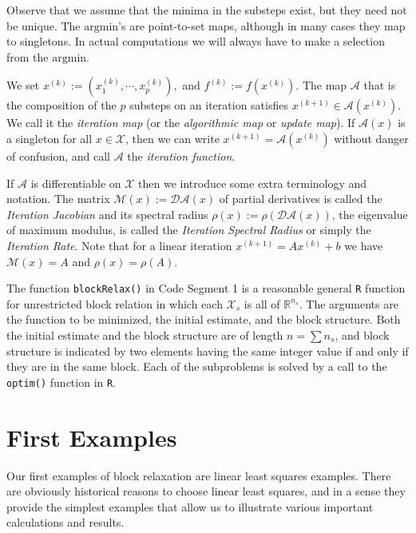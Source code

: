 \documentclass[
  12pt,
]{book}
\begin{document}
Observe that we assume that the minima in the substeps exist, but they need not be unique. The \(\mathrm{argmin}\)'s are
point-to-set maps, although in many cases they map to singletons. In actual computations we will always have to make a
selection from the \(\mathrm{argmin}\).

We set \(x^{(k)}:=(x^{(k)}_1,\cdots,x^{(k)}_p),\)
and \(f^{(k)}:=f(x^{(k)}).\)
The map \(\mathcal{A}\) that is the composition of the \(p\) substeps on an iteration satisfies \(x^{(k+1)}\in\mathcal{A}(x^{(k)})\). We call it the \emph{iteration map} (or the \emph{algorithmic map} or \emph{update map}).
If \(\mathcal{A}(x)\) is a singleton for all \(x\in\mathcal{X}\), then we can write \(x^{(k+1)}=\mathcal{A}(x^{(k)})\) without danger of confusion, and call \(\mathcal{A}\) the \emph{iteration function}.

If \(\mathcal{A}\) is differentiable on \(\mathcal{X}\) then we introduce some extra terminology and notation. The matrix \(\mathcal{M}(x):=\mathcal{DA}(x)\) of partial derivatives is called the \emph{Iteration Jacobian} and its spectral radius \(\rho(x):=\rho(\mathcal{DA}(x))\), the eigenvalue of maximum modulus, is called the \emph{Iteration Spectral Radius} or simply the \emph{Iteration Rate}. Note that for a linear iteration \(x^{(k+1)}=Ax^{(k)}+b\) we have \(\mathcal{M}(x)=A\) and \(\rho(x)=\rho(A)\).

The function \texttt{blockRelax()} in Code Segment 1 is a reasonable general \texttt{R} function for unrestricted block relation
in which each \(\mathcal{X}_s\) is all of \(\mathbb{R}^{n_s}\).
The arguments are the function to be minimized, the initial estimate, and the block structure. Both the initial estimate and the block structure are of length \(n=\sum n_s\), and block structure is indicated by two elements having the same integer value if and only if they are in the same block. Each of the subproblems is solved by a call to the \texttt{optim()}
function in \texttt{R}.

\hypertarget{blockrelaxation:firstexamples}{%
\section{First Examples}\label{blockrelaxation:firstexamples}}

Our first examples of block relaxation are linear least squares examples. There are obviously historical reasons to choose linear least squares, and in a sense they provide the simplest examples that allow us to illustrate various important calculations and results.
\end{document}
